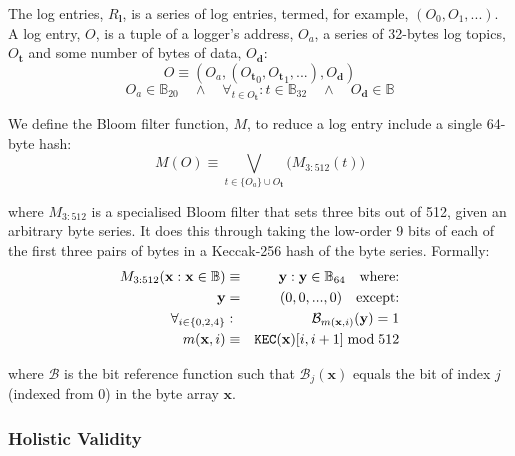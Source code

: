 \documentclass[9pt,oneside]{amsart}
\begin{document}
\begin{multicols}{2}
The log entries, $R_\mathbf{l}$, is a series of log entries, termed, for example, $(O_0, O_1, ...)$. A log entry, $O$, is a tuple of a logger's address, $O_a$, a series of 32-bytes log topics, $O_\mathbf{t}$ and some number of bytes of data, $O_\mathbf{d}$:
\begin{equation}
O \equiv (O_a, ({O_\mathbf{t}}_0, {O_\mathbf{t}}_1, ...), O_\mathbf{d})
\end{equation}
\begin{equation}
O_a \in \mathbb{B}_{20} \quad \wedge \quad \forall_{t \in O_\mathbf{t}}: t \in \mathbb{B}_{32} \quad \wedge \quad O_\mathbf{d} \in \mathbb{B}
\end{equation}

We define the Bloom filter function, $M$, to reduce a log entry include a single 64-byte hash:
\begin{equation}
M(O) \equiv \bigvee_{t \in \{O_a\} \cup O_\mathbf{t}} \big( M_{3:512}(t) \big)
\end{equation}

where $M_{3:512}$ is a specialised Bloom filter that sets three bits out of 512, given an arbitrary byte series. It does this through taking the low-order 9 bits of each of the first three pairs of bytes in a Keccak-256 hash of the byte series. Formally:
\begin{eqnarray}
M_{3:512}(\mathbf{x}: \mathbf{x} \in \mathbb{B}) & \equiv & \mathbf{y}: \mathbf{y} \in \mathbb{B}_{64} \quad \text{where:}\\
\mathbf{y} & = & (0, 0, ..., 0) \quad \text{except:}\\
\forall_{i \in \{0, 2, 4\}}&:& \mathcal{B}_{m(\mathbf{x}, i)}(\mathbf{y}) = 1\\
m(\mathbf{x}, i) &\equiv& \mathtt{\tiny KEC}(\mathbf{x})[i, i + 1] \bmod 512
\end{eqnarray}

where $\mathcal{B}$ is the bit reference function such that $\mathcal{B}_j(\mathbf{x})$ equals the bit of index $j$ (indexed from 0) in the byte array $\mathbf{x}$.

\subsubsection{Holistic Validity}


\end{multicols}
\end{document}
